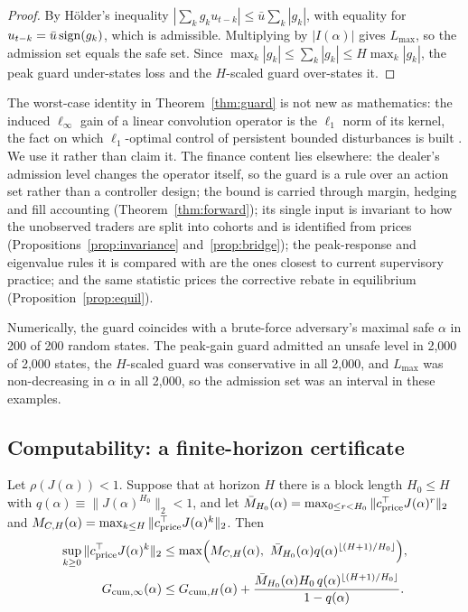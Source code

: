 \begin{proof}
By H\"older's inequality $|\sum_kg_ku_{t-k}|\le\bar u\sum_k|g_k|$, with equality for $u_{t-k}=\bar u\,{\rm sign}(g_k)$, which is admissible. Multiplying by $|I(\alpha)|$ gives $L_{\max}$, so the admission set equals the safe set. Since $\max_k|g_k|\le\sum_k|g_k|\le H\max_k|g_k|$, the peak guard under-states loss and the $H$-scaled guard over-states it.
\end{proof}

The worst-case identity in Theorem~\ref{thm:guard} is not new as mathematics: the induced $\ell_\infty$ gain of a linear convolution operator is the $\ell_1$ norm of its kernel, the fact on which $\ell_1$-optimal control of persistent bounded disturbances is built \citep{vidyasagar1986,dahleh1987,dahleh1995}. We use it rather than claim it. The finance content lies elsewhere: the dealer's admission level changes the operator itself, so the guard is a rule over an action set rather than a controller design; the bound is carried through margin, hedging and fill accounting (Theorem~\ref{thm:forward}); its single input is invariant to how the unobserved traders are split into cohorts and is identified from prices (Propositions~\ref{prop:invariance} and~\ref{prop:bridge}); the peak-response and eigenvalue rules it is compared with are the ones closest to current supervisory practice; and the same statistic prices the corrective rebate in equilibrium (Proposition~\ref{prop:equil}).

Numerically, the guard coincides with a brute-force adversary's maximal safe $\alpha$ in 200 of 200 random states. The peak-gain guard admitted an unsafe level in 2,000 of 2,000 states, the $H$-scaled guard was conservative in all 2,000, and $L_{\max}$ was non-decreasing in $\alpha$ in all 2,000, so the admission set was an interval in these examples.

\subsection{Computability: a finite-horizon certificate}

\begin{lemma}\label{lem:tail}
Let $\rho(J(\alpha))<1$. Suppose that at horizon $H$ there is a block length $H_0\le H$ with $q(\alpha)\equiv\|J(\alpha)^{H_0}\|_2<1$, and let $\bar M_{H_0}(\alpha)=\max_{0\le r<H_0}\|c^\top_{\rm price}J(\alpha)^r\|_2$ and $M_{C,H}(\alpha)=\max_{k\le H}\|c^\top_{\rm price}J(\alpha)^k\|_2$. Then
\begin{align}
\sup_{k\ge0}\|c^\top_{\rm price}J(\alpha)^k\|_2&\le\max\Bigl(M_{C,H}(\alpha),\ \bar M_{H_0}(\alpha)q(\alpha)^{\lfloor(H+1)/H_0\rfloor}\Bigr),\label{eq:tail}\\
G_{{\rm cum},\infty}(\alpha)&\le G_{{\rm cum},H}(\alpha)+\frac{\bar M_{H_0}(\alpha)H_0\,q(\alpha)^{\lfloor(H+1)/H_0\rfloor}}{1-q(\alpha)}.\notag
\end{align}
\end{lemma}

